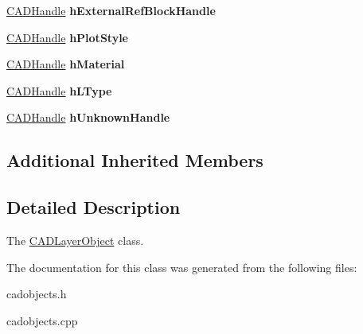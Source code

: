 \begin{DoxyCompactItemize}
\item 
\hyperlink{class_c_a_d_handle}{C\+A\+D\+Handle} {\bfseries h\+External\+Ref\+Block\+Handle}\hypertarget{class_c_a_d_layer_object_a45430119588e427c2059285140cd02d1}{}\label{class_c_a_d_layer_object_a45430119588e427c2059285140cd02d1}

\item 
\hyperlink{class_c_a_d_handle}{C\+A\+D\+Handle} {\bfseries h\+Plot\+Style}\hypertarget{class_c_a_d_layer_object_a0a53f93c4c3d7d6fa37230952ecc1bf3}{}\label{class_c_a_d_layer_object_a0a53f93c4c3d7d6fa37230952ecc1bf3}

\item 
\hyperlink{class_c_a_d_handle}{C\+A\+D\+Handle} {\bfseries h\+Material}\hypertarget{class_c_a_d_layer_object_aaaf5ecac578cde6bd7a02803581c6e4c}{}\label{class_c_a_d_layer_object_aaaf5ecac578cde6bd7a02803581c6e4c}

\item 
\hyperlink{class_c_a_d_handle}{C\+A\+D\+Handle} {\bfseries h\+L\+Type}\hypertarget{class_c_a_d_layer_object_a56401617297dedef2c828868ea5439c2}{}\label{class_c_a_d_layer_object_a56401617297dedef2c828868ea5439c2}

\item 
\hyperlink{class_c_a_d_handle}{C\+A\+D\+Handle} {\bfseries h\+Unknown\+Handle}\hypertarget{class_c_a_d_layer_object_abeba86f65459f22c4496a7aa48fee2a4}{}\label{class_c_a_d_layer_object_abeba86f65459f22c4496a7aa48fee2a4}

\end{DoxyCompactItemize}
\subsection*{Additional Inherited Members}


\subsection{Detailed Description}
The \hyperlink{class_c_a_d_layer_object}{C\+A\+D\+Layer\+Object} class. 

The documentation for this class was generated from the following files\+:\begin{DoxyCompactItemize}
\item 
cadobjects.\+h\item 
cadobjects.\+cpp\end{DoxyCompactItemize}
